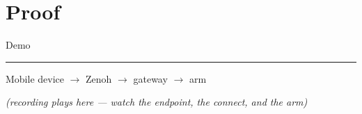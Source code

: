 \documentclass[9pt]{beamer}
\begin{document}
\section{Proof}

\begin{frame}[standout]
  \centering
  {Demo\par}
  \vspace{0.5em}
  {\color{m3DarkPrimary}\rule{0.3\textwidth}{1.2pt}\par}
  \vspace{0.5em}
  {\normalsize Mobile device $\rightarrow$ Zenoh $\rightarrow$ gateway $\rightarrow$ arm\par}
  \vspace{1.0em}
  {\small\itshape (recording plays here --- watch the endpoint, the connect, and the arm)\par}
\end{frame}
\end{document}
